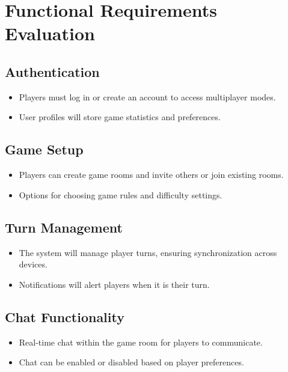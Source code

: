 \documentclass[12pt, titlepage]{article}
\begin{document}
\newpage

\tableofcontents

\listoftables %

\listoffigures %

\newpage


\section{Functional Requirements Evaluation}

\subsection{Authentication}
\begin{itemize}
    \item Players must log in or create an account to access multiplayer modes.
    \item User profiles will store game statistics and preferences.
\end{itemize}

\subsection{Game Setup}
\begin{itemize}
    \item Players can create game rooms and invite others or join existing rooms.
    \item Options for choosing game rules and difficulty settings.
\end{itemize}

\subsection{Turn Management}
\begin{itemize}
    \item The system will manage player turns, ensuring synchronization across devices.
    \item Notifications will alert players when it is their turn.
\end{itemize}

\subsection{Chat Functionality}
\begin{itemize}
    \item Real-time chat within the game room for players to communicate.
    \item Chat can be enabled or disabled based on player preferences.
\end{itemize}
\end{document}
